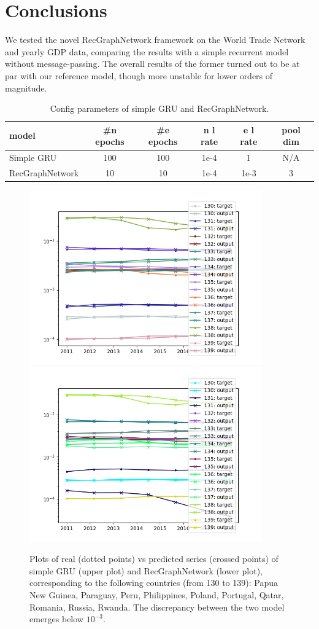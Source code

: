 \documentclass{article}
\begin{document}
\section{Conclusions}
We tested the novel RecGraphNetwork framework on the World Trade Network and yearly GDP data, comparing the results with a simple recurrent model without message-passing. The overall results of the former turned out to be at par with our reference model, though more unstable for lower orders of magnitude.

\begin{table}[h]
\centering
  \begin{tabular}{lccccc}
    \hline
     model & \#n epochs & \#e epochs & n l rate & e l rate & pool dim\\
    \hline
     Simple GRU & 100 & 100 & 1e-4 & 1 & N/A \\
     RecGraphNetwork & 10 & 10 & 1e-4 & 1e-3 & 3\\
    \hline
\end{tabular}
  \caption{Config parameters of simple GRU and RecGraphNetwork.}
  \label{tab:conf}
\end{table}

\begin{figure}
    \centering
    \includegraphics[width=100mm]{simple_output_13.png}
    \includegraphics[width=100mm]{multi_output_13.png}
    \caption{Plots of real (dotted points) vs predicted series (crossed points) of simple GRU (upper plot) and RecGraphNetwork (lower plot), corresponding to the following countries (from 130 to 139): Papua New Guinea, Paraguay, Peru, Philippines, Poland, Portugal, Qatar, Romania, Russia, Rwanda. The discrepancy between the two model emerges below $10^{-3}$.}
    \label{fig:1}
\end{figure}
\end{document}
